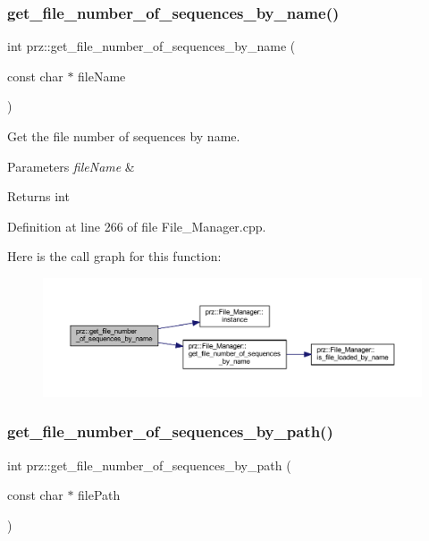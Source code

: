 \subsubsection{\texorpdfstring{get\_file\_number\_of\_sequences\_by\_name()}{get\_file\_number\_of\_sequences\_by\_name()}}
{\footnotesize\ttfamily int prz\+::get\+\_\+file\+\_\+number\+\_\+of\+\_\+sequences\+\_\+by\+\_\+name (\begin{DoxyParamCaption}\item[{const char $\ast$}]{file\+Name }\end{DoxyParamCaption})}



Get the file number of sequences by name. 


\begin{DoxyParams}{Parameters}
{\em file\+Name} & \\
\hline
\end{DoxyParams}
\begin{DoxyReturn}{Returns}
int 
\end{DoxyReturn}


Definition at line 266 of file File\+\_\+\+Manager.\+cpp.

Here is the call graph for this function\+:
\nopagebreak
\begin{figure}[H]
\begin{center}
\leavevmode
\includegraphics[width=350pt]{namespaceprz_a1e7f643937e9d287b0ee7b629861e34c_cgraph}
\end{center}
\end{figure}
\mbox{\label{namespaceprz_aea902bbb73266b76bd53325b0c23da4c}} 
\subsubsection{\texorpdfstring{get\_file\_number\_of\_sequences\_by\_path()}{get\_file\_number\_of\_sequences\_by\_path()}}
{\footnotesize\ttfamily int prz\+::get\+\_\+file\+\_\+number\+\_\+of\+\_\+sequences\+\_\+by\+\_\+path (\begin{DoxyParamCaption}\item[{const char $\ast$}]{file\+Path }\end{DoxyParamCaption})}



